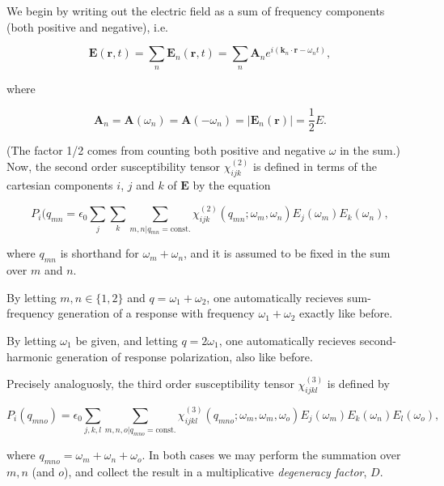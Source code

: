 \documentclass{article}
\begin{document}
We begin by writing out the electric field as a sum of frequency components (both positive and negative), i.e.

\begin{equation}
\label{E_freq_comp}
\bm{E}(\bm{r},t) = \sum_n \bm{E}_n (\bm{r}, t) =  \sum_n \bm{A}_n e^{i(\bm{k}_n \cdot \bm{r} - \omega_n t)},
\end{equation}

where

\begin{equation}
\bm{A}_n = \bm{A}(\omega_n) = \bm{A}(-\omega_n) = |\bm{E}_n (\bm{r})| = \frac{1}{2}E.
\end{equation}

(The factor 1/2 comes from counting both positive and negative $\omega$ in the sum.) Now, the second order susceptibility tensor $\chi_{ijk}^{(2)}$ is defined in terms of the cartesian components $i$, $j$ and $k$ of $\bm{E}$ by the equation

\begin{equation}
P_i(q_{mn} = \epsilon_0 \sum_{j}\sum_{k}\sum_{m,n | q_{mn}=\text{const.}} \chi_{ijk}^{(2)}(q_{mn}; \omega_m, \omega_n )E_j (\omega_m )E_k(\omega_n ),
\end{equation}

where $q_{mn}$ is shorthand for $\omega_m + \omega_n$, and it is assumed to be fixed in the sum over $m$ and $n$.

By letting $m,n \in \{1,2\}$ and $q = \omega_1 + \omega_2$, one automatically recieves sum-frequency generation of a response with frequency $\omega_1 + \omega_2$ exactly like before.

By letting $\omega_1$ be given, and letting $q = 2\omega_1$, one automatically recieves second-harmonic generation of response polarization, also like before.

Precisely analoguosly, the third order susceptibility tensor $\chi_{ijkl}^{(3)}$ is defined by

\begin{equation}
P_i(q_{mno}) = \epsilon_0 \sum_{j,k,l}\sum_{m,n,o | q_{mno}=\text{const.}} \chi_{ijkl}^{(3)}(q_{mno}; \omega_m , \omega_m , \omega_o )E_j (\omega_m )E_k(\omega_n )E_l(\omega_o),
\end{equation}

where $q_{mno} = \omega_m + \omega_n + \omega_o$. In both cases we may perform the summation over $m,n$ (and $o$), and collect the result in a multiplicative \textit{degeneracy factor}, $D$.
\end{document}

